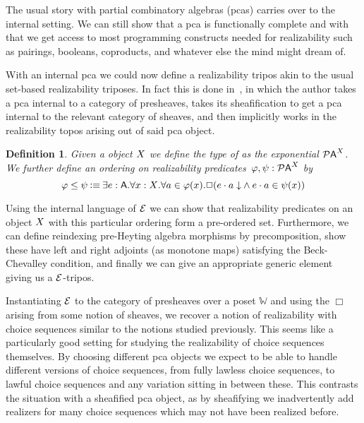 \documentclass{easychair}
\newtheorem{defn}[thrm]{Definition}
\begin{document}
The usual story with partial combinatory algebras (pcas) carries over to the
internal setting.
%
We can still show that a pca is functionally complete and with that we get
access to most programming constructs needed for realizability such as pairings,
booleans, coproducts, and whatever else the mind might dream of.

With an internal pca we could now define a realizability tripos akin to the
usual set-based realizability triposes.
%
In fact this is done in~\cite{vanoostenSemanticalProofJonghs1991}, in which the
author takes a pca internal to a category of presheaves, takes its
sheafification to get a pca internal to the relevant category of sheaves, and
then implicitly works in the realizability topos arising out of said pca object.
%


\begin{defn}
  Given a object \(X\) we define the type of  as the exponential \({\mathcal{P}{\mathsf{A}}}^{X} \).
  We further define an ordering on realizability
  predicates~\(\varphi, \psi : {\mathcal{P}{\mathsf{A}}}^{X}\) by
  \[
    \varphi \leq \psi
    \IsDefined
    \IExists{e : \A}{
      \IForall{x : \X}{
        \IForall{a \in \varphi(x)}{
          \IBox{(
            \IAnd%
            {\ITotal{\IAp{e}{a}}}%
            {\IAp{e}{a} \in \psi(x)}
          )}
        }
      }
    }
  \]
\end{defn}

Using the internal language of \(\mathcal{E}\) we can show that realizability predicates
on an object \(X\) with this particular ordering form a pre-ordered set.
%
Furthermore, we can define reindexing pre-Heyting algebra morphisms by
precomposition, show these have left and right adjoints (as monotone maps)
satisfying the Beck-Chevalley condition, and finally we can give an appropriate
generic element giving us a \(\mathcal{E}\)-tripos.

Instantiating \(\mathcal{E}\) to the category of presheaves over a poset \(\mathbb{W}\)
and using the \(\Box\) arising from some notion of sheaves, we recover a notion
of realizability with choice sequences similar to the notions studied
previously.
%
This seems like a particularly good setting for studying the realizability
of choice sequences themselves.
%
By choosing different pca objects we expect to be able to handle different
versions of choice sequences, from fully lawless choice sequences, to lawful
choice sequences and any variation sitting in between these.
%
This contrasts the situation with a sheafified pca object, as by sheafifying
we inadvertently add realizers for many choice sequences which may not
have been realized before.





\label{sect:bib}

%
%
%


\end{document}

